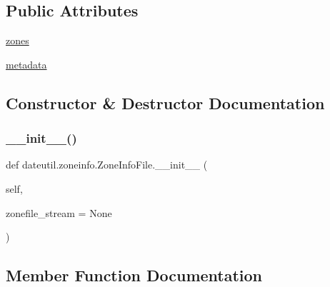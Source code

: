 \subsection*{Public Attributes}
\begin{DoxyCompactItemize}
\item 
\hyperlink{classdateutil_1_1zoneinfo_1_1ZoneInfoFile_a61a09803c570d7fa7d2e34211a962896}{zones}
\item 
\hyperlink{classdateutil_1_1zoneinfo_1_1ZoneInfoFile_a31d874eb36efd8f25ff8bb4ce5a9795b}{metadata}
\end{DoxyCompactItemize}


\subsection{Constructor \& Destructor Documentation}
\mbox{\label{classdateutil_1_1zoneinfo_1_1ZoneInfoFile_a279a7e2a3485ef6b7b09131401f37b74}} 
\subsubsection{\texorpdfstring{\+\_\+\+\_\+init\+\_\+\+\_\+()}{\_\_init\_\_()}}
{\footnotesize\ttfamily def dateutil.\+zoneinfo.\+Zone\+Info\+File.\+\_\+\+\_\+init\+\_\+\+\_\+ (\begin{DoxyParamCaption}\item[{}]{self,  }\item[{}]{zonefile\+\_\+stream = {\ttfamily None} }\end{DoxyParamCaption})}



\subsection{Member Function Documentation}
\mbox{\label{classdateutil_1_1zoneinfo_1_1ZoneInfoFile_a0860a277d5a39b674d5bd527da092710}} 
